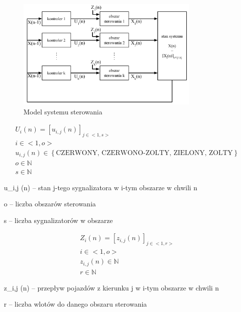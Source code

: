\begin{figure}[h]
    \centering
    \includegraphics[width=0.8\textwidth]{images/model.pdf}
    \caption{Model systemu sterowania}
    \label{fig:model}
\end{figure}

\begin{equation}
	\begin{array}{c}
		U_i (n) = \left[ u_{i, j} (n) \right]_{j \in <1,s>}\\
		i \in <1,o>\\
		u_{i, j} (n) \in \left\{ \textrm{CZERWONY, CZERWONO-ZOLTY, ZIELONY, ZOLTY} \right\}\\
		o \in \mathbb{N}\\
		s \in \mathbb{N}
	\end{array}
\end{equation}

u_{i,j} (n) \textrm{ -- stan j-tego sygnalizatora w i-tym obszarze w chwili n}

o -- liczba obszarów sterowania

s -- liczba sygnalizatorów w obszarze

\begin{equation}
	\begin{array}{c}
		Z_i (n) = \left[ z_{i, j} (n) \right]_{j \in <1,r>}\\
		i \in <1,o>\\
		z_{i, j} (n) \in \mathbb{N}\\
		r \in \mathbb{N}
	\end{array}
\end{equation}

z_{i,j} (n) \textrm{ -- przepływ pojazdów z kierunku j w i-tym obszarze w chwili n}

r -- liczba wlotów do danego obszaru sterowania

